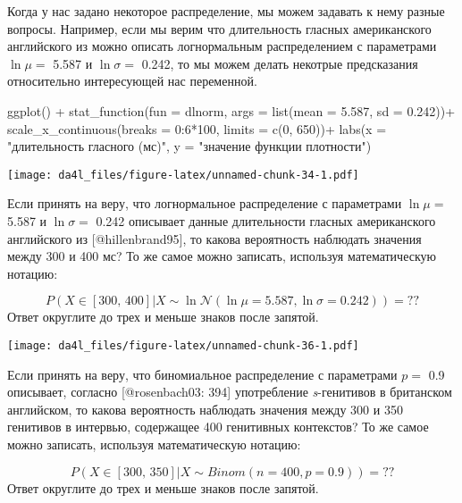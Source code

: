 \documentclass[
]{book}
\makeatletter
\newenvironment{Shaded}{\begin{snugshade}}{\end{snugshade}}
\newcommand{\AttributeTok}[1]{\textcolor[rgb]{0.77,0.63,0.00}{#1}}
\newcommand{\DecValTok}[1]{\textcolor[rgb]{0.00,0.00,0.81}{#1}}
\newcommand{\FloatTok}[1]{\textcolor[rgb]{0.00,0.00,0.81}{#1}}
\newcommand{\FunctionTok}[1]{\textcolor[rgb]{0.00,0.00,0.00}{#1}}
\newcommand{\NormalTok}[1]{#1}
\newcommand{\SpecialCharTok}[1]{\textcolor[rgb]{0.00,0.00,0.00}{#1}}
\newcommand{\StringTok}[1]{\textcolor[rgb]{0.31,0.60,0.02}{#1}}
\newenvironment{kframe}{%
    \medskip{}
    \setlength{\fboxsep}{.8em}
    \def\at@end@of@kframe{}%
    \ifinner\ifhmode%
    \def\at@end@of@kframe{\end{minipage}}%
    \begin{minipage}{\columnwidth}%
    \fi\fi%
    \def\FrameCommand##1{\hskip\@totalleftmargin \hskip-\fboxsep
    \colorbox{shadecolor}{##1}\hskip-\fboxsep
        \hskip-\linewidth \hskip-\@totalleftmargin \hskip\columnwidth}%
    \MakeFramed {\advance\hsize-\width
      \@totalleftmargin\z@ \linewidth\hsize
      \@setminipage}}%
  {\par\unskip\endMakeFramed%
    \at@end@of@kframe}
\newenvironment{rmdblock}[1]
  {
    \begin{itemize}
    \renewcommand{\labelitemi}{
      \raisebox{-.7\height}[0pt][0pt]{
        {\setkeys{Gin}{width=3em,keepaspectratio}\texttt{[image: images/\#1]}}
        }
        }
        \setlength{\fboxsep}{1em}
        \begin{kframe}
        \item
      }
      {
        \end{kframe}
        \end{itemize}
      }
\newenvironment{rmdtask}
      {\begin{rmdblock}{task}}
      {\end{rmdblock}}
\makeatother
\begin{document}
Когда у нас задано некоторое распределение, мы можем задавать к нему разные вопросы. Например, если мы верим что длительность гласных американского английского из \citep{hillenbrand95} можно описать логнормальным распределением с параметрами \(\ln{\mu} =\) 5.587 и \(\ln{\sigma} =\) 0.242, то мы можем делать некотрые предсказания относительно интересующей нас переменной.

\begin{Shaded}
\begin{Highlighting}[]
\FunctionTok{ggplot}\NormalTok{() }\SpecialCharTok{+} 
  \FunctionTok{stat\_function}\NormalTok{(}\AttributeTok{fun =}\NormalTok{ dlnorm, }\AttributeTok{args =} \FunctionTok{list}\NormalTok{(}\AttributeTok{mean =} \FloatTok{5.587}\NormalTok{, }\AttributeTok{sd =} \FloatTok{0.242}\NormalTok{))}\SpecialCharTok{+}
  \FunctionTok{scale\_x\_continuous}\NormalTok{(}\AttributeTok{breaks =} \DecValTok{0}\SpecialCharTok{:}\DecValTok{6}\SpecialCharTok{*}\DecValTok{100}\NormalTok{, }\AttributeTok{limits =} \FunctionTok{c}\NormalTok{(}\DecValTok{0}\NormalTok{, }\DecValTok{650}\NormalTok{))}\SpecialCharTok{+}
  \FunctionTok{labs}\NormalTok{(}\AttributeTok{x =} \StringTok{"длительность гласного (мс)"}\NormalTok{,}
       \AttributeTok{y =} \StringTok{"значение функции плотности"}\NormalTok{)}
\end{Highlighting}
\end{Shaded}

\texttt{[image: da4l\_files/figure-latex/unnamed-chunk-34-1.pdf]}

\begin{rmdtask}
Если принять на веру, что логнормальное распределение с параметрами
\(\ln{\mu} =\) 5.587 и \(\ln{\sigma}=\) 0.242 описывает данные
длительности гласных американского английского из {[}@hillenbrand95{]},
то какова вероятность наблюдать значения между 300 и 400 мс? То же самое
можно записать, используя математическую нотацию:

\[P\left(X \in [300,\, 400] | X \sim \ln{\mathcal{N}}(\ln{\mu} = 5.587, \ln{\sigma}=0.242)\right) = ??\]
Ответ округлите до трех и меньше знаков после запятой.
\end{rmdtask}

\texttt{[image: da4l\_files/figure-latex/unnamed-chunk-36-1.pdf]}

\begin{rmdtask}
Если принять на веру, что биномиальное распределение с параметрами
\(p =\) 0.9 описывает, согласно {[}@rosenbach03: 394{]} употребление
\emph{s}-генитивов в британском английском, то какова вероятность
наблюдать значения между 300 и 350 генитивов в интервью, содержащее 400
генитивных контекстов? То же самое можно записать, используя
математическую нотацию:

\[P\left(X \in [300,\, 350] | X \sim Binom(n = 400, p = 0.9)\right) = ??\]
Ответ округлите до трех и меньше знаков после запятой.
\end{rmdtask}
\end{document}
